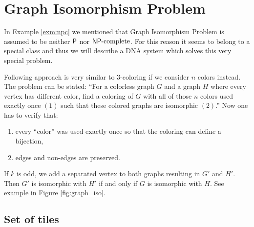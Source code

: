 \section{Graph Isomorphism Problem}

In Example \ref{exm:npc} we mentioned that Graph Isomorphism Problem is assumed to be neither $\P$ nor $\NPC$. For this reason it seems to belong to a special class and thus we will describe a DNA system which solves this very special problem. %

Following approach is very similar to 3-coloring if we consider $n$ colors instead. The problem can be stated: ``For a colorless graph $G$ and a graph $H$ where every vertex has different color, find a coloring of $G$ with all of those $n$ colors used exactly once $(1)$ such that these colored graphs are isomorphic $(2)$.'' Now one has to verify that:
\begin{enumerate}
	\item every ``color'' was used exactly once so that the coloring can define a bijection,
	\item edges and non-edges are preserved.
\end{enumerate}

If $k$ is odd, we add a separated vertex to both graphs resulting in $G'$ and $H'$. Then $G'$ is isomorphic with $H'$ if and only if $G$ is isomorphic with $H$. See example in Figure \ref{fig:graph_iso}.

\subsection*{Set of tiles}

